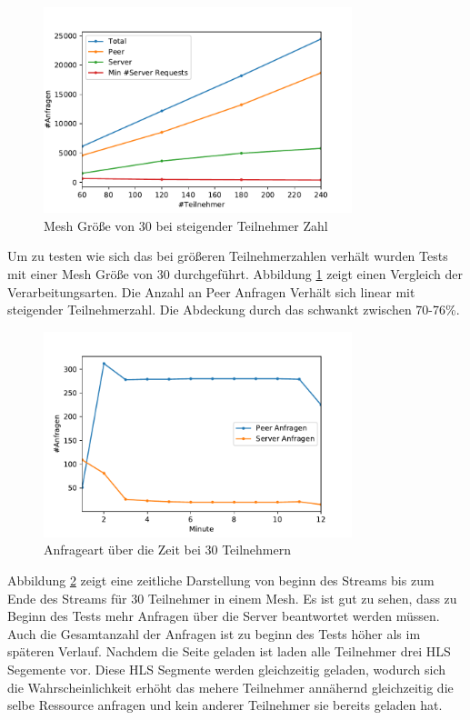 \begin{figure}[!h]
	\centering
	\includegraphics[width=0.8\textwidth]{figures/meshed_30_line}
	\caption[A Figure Short-Title]{Mesh Größe von 30 bei steigender Teilnehmer Zahl}
	\label{fig:meshed_30_line}
\end{figure}

Um zu testen wie sich das \cdn bei größeren Teilnehmerzahlen verhält wurden Tests mit einer Mesh Größe von 30 durchgeführt. Abbildung \ref{fig:meshed_30_line} zeigt einen Vergleich der Verarbeitungsarten. Die Anzahl an Peer Anfragen Verhält sich linear mit steigender Teilnehmerzahl. Die Abdeckung durch das \cdn schwankt zwischen 70-76\%.


\begin{figure}[!h]
	\centering
	\includegraphics[width=0.8\textwidth]{figures/peer_vs_server_over_time}
	\caption[A Figure Short-Title]{Anfrageart über die Zeit bei 30 Teilnehmern}
	\label{fig:peer_vs_server_over_time}
\end{figure}

Abbildung \ref{fig:peer_vs_server_over_time} zeigt eine zeitliche Darstellung von beginn des Streams bis zum Ende des Streams für 30 Teilnehmer in einem Mesh. Es ist gut zu sehen, dass zu Beginn des Tests mehr Anfragen über die Server beantwortet werden müssen. Auch die Gesamtanzahl der Anfragen ist zu beginn des Tests höher als im späteren Verlauf. Nachdem die Seite geladen ist laden alle Teilnehmer drei HLS Segemente vor. Diese HLS Segmente werden gleichzeitig geladen, wodurch sich die Wahrscheinlichkeit erhöht das mehere Teilnehmer annähernd gleichzeitig die selbe Ressource anfragen und kein anderer Teilnehmer sie bereits geladen hat. 

